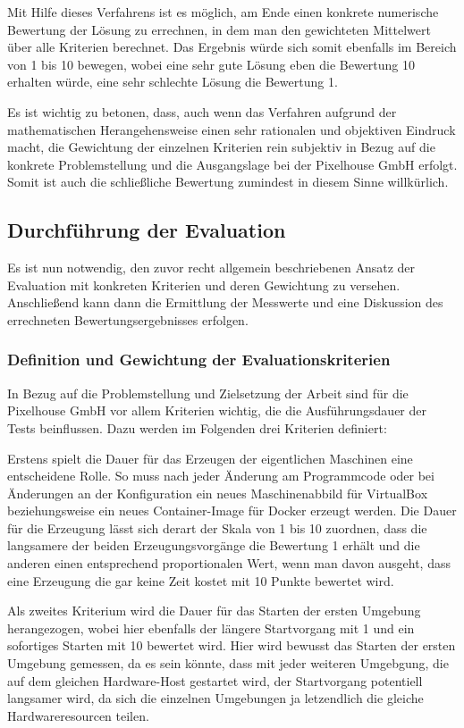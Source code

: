 Mit Hilfe dieses Verfahrens ist es möglich, am Ende einen konkrete numerische Bewertung der Lösung zu errechnen, in dem man den gewichteten Mittelwert über alle Kriterien berechnet. Das Ergebnis würde sich somit ebenfalls im Bereich von 1 bis 10 bewegen, wobei eine sehr gute Lösung eben die Bewertung 10 erhalten würde, eine sehr schlechte Lösung die Bewertung 1.

Es ist wichtig zu betonen, dass, auch wenn das Verfahren aufgrund der mathematischen Herangehensweise einen sehr rationalen und objektiven Eindruck macht, die Gewichtung der einzelnen Kriterien rein subjektiv in Bezug auf die konkrete Problemstellung und die Ausgangslage bei der Pixelhouse GmbH erfolgt. Somit ist auch die schließliche Bewertung zumindest in diesem Sinne willkürlich.

\subsection{Durchführung der Evaluation}

Es ist nun notwendig, den zuvor recht allgemein beschriebenen Ansatz der Evaluation mit konkreten Kriterien und deren Gewichtung zu versehen. Anschließend kann dann die Ermittlung der Messwerte und eine Diskussion des errechneten Bewertungsergebnisses erfolgen.

\subsubsection{Definition und Gewichtung der Evaluationskriterien}

In Bezug auf die Problemstellung und Zielsetzung der Arbeit sind für die Pixelhouse GmbH vor allem Kriterien wichtig, die die Ausführungsdauer der Tests beinflussen. Dazu werden im Folgenden drei Kriterien definiert:

Erstens spielt die Dauer für das Erzeugen der eigentlichen Maschinen eine entscheidene Rolle. So muss nach jeder Änderung am Programmcode oder bei Änderungen an der Konfiguration ein neues Maschinenabbild für VirtualBox beziehungsweise ein neues Container-Image für Docker erzeugt werden. Die Dauer für die Erzeugung lässt sich derart der Skala von 1 bis 10 zuordnen, dass die langsamere der beiden Erzeugungsvorgänge die Bewertung 1 erhält und die anderen einen entsprechend proportionalen Wert, wenn man davon ausgeht, dass eine Erzeugung die gar keine Zeit kostet mit 10 Punkte bewertet wird.

Als zweites Kriterium wird die Dauer für das Starten der ersten Umgebung herangezogen, wobei hier ebenfalls der längere Startvorgang mit 1 und ein sofortiges Starten mit 10 bewertet wird. Hier wird bewusst das Starten der ersten Umgebung gemessen, da es sein könnte, dass mit jeder weiteren Umgebgung, die auf dem gleichen Hardware-Host gestartet wird, der Startvorgang potentiell langsamer wird, da sich die einzelnen Umgebungen ja letzendlich die gleiche Hardwareresourcen teilen.

